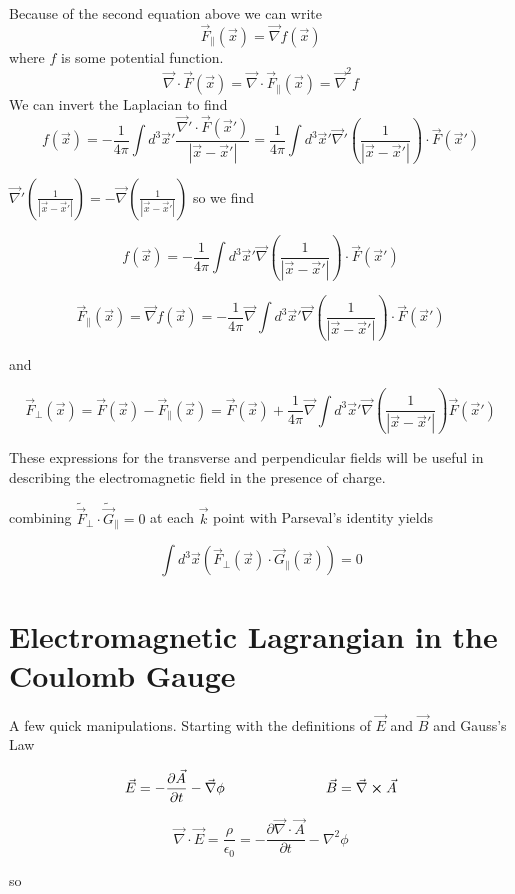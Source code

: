 \documentclass[12pt]{article}
\newcommand{\pll}{\parallel}
\newcommand{\pardiv}[2][]{\frac{\partial #1}{\partial #2}}
\newcommand{\vecnab}{\vec{\nabla}}
\begin{document}
Because of the second equation above we can write
\[\vec{F}_{\pll}(\vec{x}) = \vecnab f(\vec{x}) \]
where $f$ is some potential function. 
\[ \vecnab \cdot \vec{F}(\vec{x}) = \vecnab \cdot \vec{F}_{\pll}(\vec{x}) = \vecnab^2 f\]
We can invert the Laplacian to find
\[ f(\vec{x}) = -\frac{1}{4\pi} \int d^3 \vec{x}' \frac{\vecnab'\cdot\vec{F}(\vec{x}')}{|\vec{x} - \vec{x}'|} = \frac{1}{4\pi} \int d^3\vec{x}' \vecnab'\left(\frac{1}{|\vec{x}-\vec{x}'|}\right) \cdot \vec{F}(\vec{x}') \]

$\vecnab'\left(\frac{1}{|\vec{x}-\vec{x}'|}\right) = -\vecnab\left(\frac{1}{|\vec{x}-\vec{x}'|}\right)$ so we find

\[f(\vec{x}) = -\frac{1}{4\pi} \int d^3\vec{x}' \vecnab\left(\frac{1}{|\vec{x}-\vec{x}'|}\right) \cdot \vec{F}(\vec{x}') \] 

\[\vec{F}_{\pll}(\vec{x}) = \vecnab f(\vec{x}) = -\frac{1}{4\pi} \vecnab \int d^3\vec{x}' \vecnab\left(\frac{1}{|\vec{x}-\vec{x}'|}\right) \cdot \vec{F}(\vec{x}') \]

and

\[\vec{F}_{\perp}(\vec{x}) = \vec{F}(\vec{x}) - \vec{F}_{\pll}(\vec{x})  = \vec{F}(\vec{x}) +\frac{1}{4\pi} \vecnab \int d^3 \vec{x}' \vecnab\left(\frac{1}{|\vec{x}-\vec{x}'|}\right) \vec{F}(\vec{x}') \]

These expressions for the transverse and perpendicular fields will be useful in describing the electromagnetic field in the presence of charge.

combining $\tilde{\vec{F}}_{\perp} \cdot \tilde{\vec{G}}_{\pll} = 0$ at each $\vec{k}$ point with Parseval's identity yields

\[\int d^3 \vec{x} \left(\vec{F}_{\perp}(\vec{x}) \cdot \vec{G}_{\pll}(\vec{x}) \right) =0 \]

\section{Electromagnetic Lagrangian in the Coulomb Gauge}

A few quick manipulations. Starting with the definitions of $\vec{E}$ and $\vec{B}$ and Gauss's Law

\[ \vec{E} = -\pardiv[\vec{A}]{t} - \vecnab \phi \hspace{1 in} \vec{B} = \vecnab \cross \vec{A} \]

\[ \vecnab \cdot \vec{E} = \frac{\rho}{\epsilon_0} = -\pardiv[\vecnab\cdot\vec{A}]{t} - \nabla^2 \phi \]

so
\end{document}
